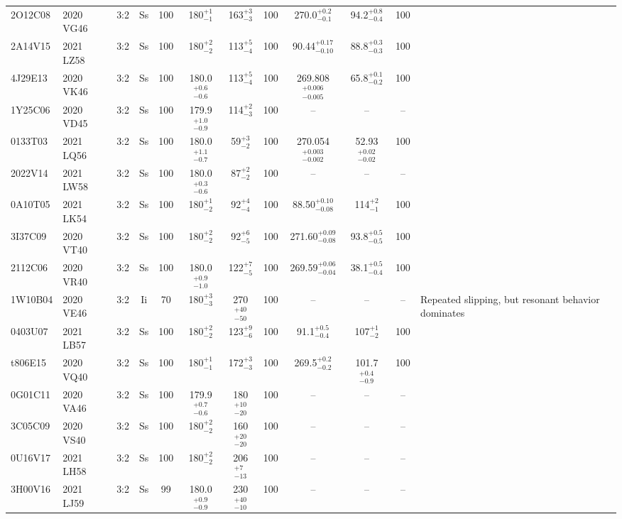 \begin{longrotatetable}
\begin{longtable}{ll|ccccccccc | l}
2O12C08 & 2020 VG46 & 3:2 & Ss & 100 & 180$_{-1}^{+1}$ & 163$_{-3}^{+3}$ & 100 & 270.0$_{-0.1}^{+0.2}$ & 94.2$_{-0.4}^{+0.8}$ & 100 & \\ 
2A14V15 & 2021 LZ58 & 3:2 & Ss & 100 & 180$_{-2}^{+2}$ & 113$_{-4}^{+5}$ & 100 & 90.44$_{-0.10}^{+0.17}$ & 88.8$_{-0.3}^{+0.3}$ & 100 & \\ 
4J29E13 & 2020 VK46 & 3:2 & Ss & 100 & 180.0$_{-0.6}^{+0.6}$ & 113$_{-4}^{+5}$ & 100 & 269.808$_{-0.005}^{+0.006}$ & 65.8$_{-0.2}^{+0.1}$ & 100 & \\ 
1Y25C06 & 2020 VD45 & 3:2 & Ss & 100 & 179.9$_{-0.9}^{+1.0}$ & 114$_{-3}^{+2}$ & 100 & -- & -- & -- & \\ 
0133T03 & 2021 LQ56 & 3:2 & Ss & 100 & 180.0$_{-0.7}^{+1.1}$ & 59$_{-2}^{+3}$ & 100 & 270.054$_{-0.002}^{+0.003}$ & 52.93$_{-0.02}^{+0.02}$ & 100 & \\ 
2022V14 & 2021 LW58 & 3:2 & Ss & 100 & 180.0$_{-0.6}^{+0.3}$ & 87$_{-2}^{+2}$ & 100 & -- & -- & -- & \\ 
0A10T05 & 2021 LK54 & 3:2 & Ss & 100 & 180$_{-2}^{+1}$ & 92$_{-4}^{+4}$ & 100 & 88.50$_{-0.08}^{+0.10}$ & 114$_{-1}^{+2}$ & 100 & \\ 
3I37C09 & 2020 VT40 & 3:2 & Ss & 100 & 180$_{-2}^{+2}$ & 92$_{-5}^{+6}$ & 100 & 271.60$_{-0.08}^{+0.09}$ & 93.8$_{-0.5}^{+0.5}$ & 100 & \\ 
2112C06 & 2020 VR40 & 3:2 & Ss & 100 & 180.0$_{-1.0}^{+0.9}$ & 122$_{-5}^{+7}$ & 100 & 269.59$_{-0.04}^{+0.06}$ & 38.1$_{-0.4}^{+0.5}$ & 100 & \\ 
1W10B04 & 2020 VE46 & 3:2 & Ii & 70 & 180$_{-3}^{+3}$ & 270$_{-50}^{+40}$ & 100 & -- & -- & -- & Repeated slipping, but resonant behavior dominates  \\ 
0403U07 & 2021 LB57 & 3:2 & Ss & 100 & 180$_{-2}^{+2}$ & 123$_{-6}^{+9}$ & 100 & 91.1$_{-0.4}^{+0.5}$ & 107$_{-2}^{+1}$ & 100 & \\ 
t806E15 & 2020 VQ40 & 3:2 & Ss & 100 & 180$_{-1}^{+1}$ & 172$_{-3}^{+3}$ & 100 & 269.5$_{-0.2}^{+0.2}$ & 101.7$_{-0.9}^{+0.4}$ & 100 & \\ 
0G01C11 & 2020 VA46 & 3:2 & Ss & 100 & 179.9$_{-0.6}^{+0.7}$ & 180$_{-20}^{+10}$ & 100 & -- & -- & -- & \\ 
3C05C09 & 2020 VS40 & 3:2 & Ss & 100 & 180$_{-2}^{+2}$ & 160$_{-20}^{+20}$ & 100 & -- & -- & -- & \\ 
0U16V17 & 2021 LH58 & 3:2 & Ss & 100 & 180$_{-2}^{+2}$ & 206$_{-13}^{+7}$ & 100 & -- & -- & -- & \\ 
3H00V16 & 2021 LJ59 & 3:2 & Ss & 99 & 180.0$_{-0.9}^{+0.9}$ & 230$_{-10}^{+40}$ & 100 & -- & -- & -- & \\ 

\end{longtable}
\end{longrotatetable}
